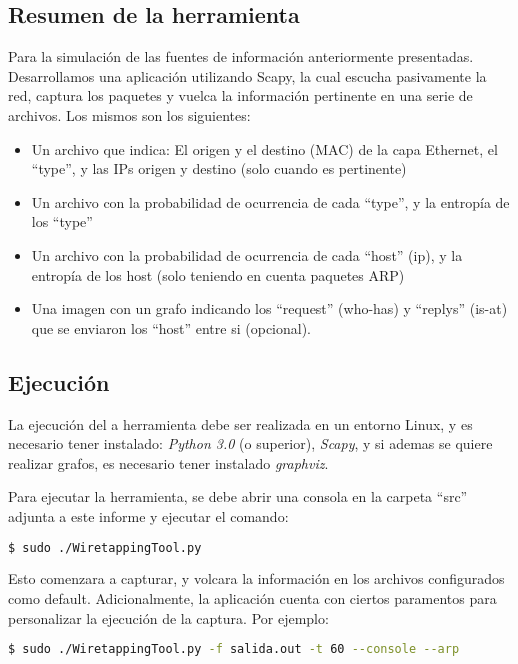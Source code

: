 \subsection{Resumen de la herramienta}

Para la simulación de las fuentes de información anteriormente presentadas. Desarrollamos una aplicación utilizando Scapy, la cual escucha pasivamente la red, captura los paquetes y vuelca la información pertinente en una serie de archivos. Los mismos son los siguientes:

\begin{itemize}
	\item Un archivo que indica: El origen y el destino (MAC) de la capa Ethernet, el ``type'', y las IPs origen y destino (solo cuando es pertinente)
	\item Un archivo con la probabilidad de ocurrencia de cada ``type'', y la entropía de los ``type''
	\item Un archivo con la probabilidad de ocurrencia de cada ``host'' (ip), y la entropía de los host (solo teniendo en cuenta paquetes ARP)
	\item Una imagen con un grafo indicando los ``request'' (who-has) y ``replys'' (is-at) que se enviaron los ``host'' entre si (opcional).
\end{itemize}

\subsection{Ejecución}

La ejecución del a herramienta debe ser realizada en un entorno Linux, y es necesario tener instalado: \textit{Python 3.0} (o superior), \textit{Scapy}, y si ademas se quiere realizar grafos, es necesario tener instalado \textit{graphviz}.

Para ejecutar la herramienta, se debe abrir una consola en la carpeta ``src'' adjunta a este informe y ejecutar el comando:

\begin{lstlisting}[language=bash]
  $ sudo ./WiretappingTool.py
\end{lstlisting}

Esto comenzara a capturar, y volcara la información en los archivos configurados como default.
Adicionalmente, la aplicación cuenta con ciertos paramentos para personalizar la ejecución de la captura. Por ejemplo:

\begin{lstlisting}[language=bash]
  $ sudo ./WiretappingTool.py -f salida.out -t 60 --console --arp
\end{lstlisting}

